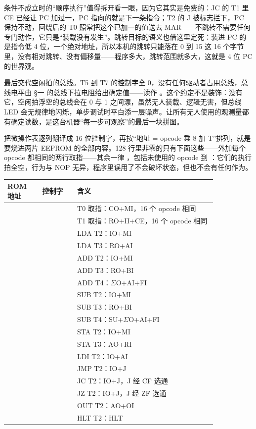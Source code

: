 条件不成立时的“顺序执行”值得拆开看一眼，因为它其实是免费的：JC 的 T1 里 CE 已经让 PC 加过一，PC 指向的就是下一条指令；T2 的 J 被标志拦下，PC 保持不动，回绕后的 T0 照常把这个已加一的值送去 MAR——不跳转不需要任何专门动作，它只是“装载没有发生”。跳转目标的语义也借这里定死：装进 PC 的是指令低 4 位，一个绝对地址，所以本机的跳转只能落在 0 到 15 这 16 个字节里，没有相对跳转、没有偏移量——程序多大，跳转范围就多大，这就是 4 位 PC 的世界观。

最后交代空闲拍的总线。T5 到 T7 的控制字全 0，没有任何驱动者占用总线，总线电平由 §一 的总线下拉电阻给出确定值——读作 。这个约定不是装饰：没有它，空闲拍浮空的总线会在 0 与 1 之间漂，虽然无人装载、逻辑无害，但总线 LED 会无规律地闪烁，单步调试时平白添一层噪声。让所有无人使用的观测量都有确定读数，是这台机器“每一步可观察”的最后一块拼图。

把微操作表逐列翻译成 16 位控制字，再按“地址 = opcode 乘 8 加 T”排列，就是要烧进两片 EEPROM 的全部内容。128 行里非零的只有下面这些——外加每个 opcode 都相同的两行取指——其余一律 ，包括未使用的 opcode  到 ：它们的执行拍全空，行为与 NOP 无异，程序里误用了不会破坏状态，但也不会有任何作为。

\begin{longtable}{L{0.14\linewidth}L{0.14\linewidth}L{0.56\linewidth}}
\toprule
ROM 地址 & 控制字 & 含义 \\
\midrule
{} &  & T0 取指：CO+MI，16 个 opcode 相同 \\
 &  & T1 取指：RO+II+CE，16 个 opcode 相同 \\
 &  & LDA T2：IO+MI \\
 &  & LDA T3：RO+AI \\
 &  & ADD T2：IO+MI \\
 &  & ADD T3：RO+BI \\
 &  & ADD T4：$\Sigma$O+AI+FI \\
 &  & SUB T2：IO+MI \\
 &  & SUB T3：RO+BI \\
 &  & SUB T4：SU+$\Sigma$O+AI+FI \\
 &  & STA T2：IO+MI \\
 &  & STA T3：AO+RI \\
 &  & LDI T2：IO+AI \\
 &  & JMP T2：IO+J \\
 &  & JC T2：IO+J，J 经 CF 选通 \\
 &  & JZ T2：IO+J，J 经 ZF 选通 \\
 &  & OUT T2：AO+OI \\
 &  & HLT T2：HLT \\
\bottomrule
\end{longtable}

